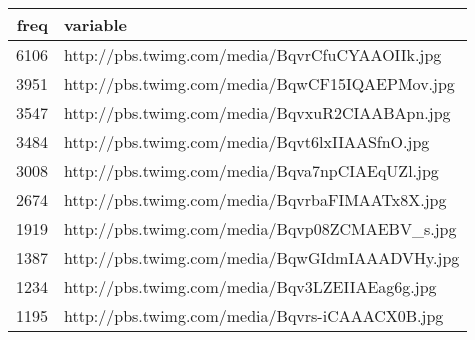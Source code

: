 \begin{table}[ht]
\centering
\begin{tabular}{rl}
  \hline
freq & variable \\ 
  \hline
6106 & http://pbs.twimg.com/media/BqvrCfuCYAAOIIk.jpg \\ 
  3951 & http://pbs.twimg.com/media/BqwCF15IQAEPMov.jpg \\ 
  3547 & http://pbs.twimg.com/media/BqvxuR2CIAABApn.jpg \\ 
  3484 & http://pbs.twimg.com/media/Bqvt6lxIIAASfnO.jpg \\ 
  3008 & http://pbs.twimg.com/media/Bqva7npCIAEqUZl.jpg \\ 
  2674 & http://pbs.twimg.com/media/BqvrbaFIMAATx8X.jpg \\ 
  1919 & http://pbs.twimg.com/media/Bqvp08ZCMAEBV\_s.jpg \\ 
  1387 & http://pbs.twimg.com/media/BqwGIdmIAAADVHy.jpg \\ 
  1234 & http://pbs.twimg.com/media/Bqv3LZEIIAEag6g.jpg \\ 
  1195 & http://pbs.twimg.com/media/Bqvrs-iCAAACX0B.jpg \\ 
   \hline
\end{tabular}
\end{table}
